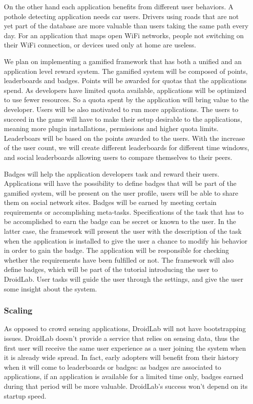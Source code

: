 \documentclass[conference,letterpaper]{IEEEtran}
\begin{document}
On the other hand each application benefits from different user behaviors. A pothole detecting application needs car users. Drivers using roads that are not yet part of the database are more valuable than users taking the same path every day. For an application that maps open WiFi networks, people not switching on their WiFi connection, or devices used only at home are useless.


We plan on implementing a gamified framework  that has both a unified and an application level reward system. The gamified system will be composed of points, leaderboards and badges. Points will be awarded for quotas that the applications spend. As developers have limited quota available, applications will be optimized to use fewer resources. So a quota spent by the application will bring value to the developer. Users will be also motivated to run more applications. The users to succeed in the game will have to make their setup desirable to the applications, meaning more plugin installations, permissions and higher quota limits. Leaderboars will be based on the points awarded to the users. With the increase of the user count, we will create different leaderboards for different time windows, and social leaderboards allowing users to compare themselves to their peers.

Badges will help the application developers task and reward their users. Applications will have the possibility to define badges that will be part of the gamified system, will be present on the user profile, users will be able to share them on social network sites. Badges will be earned by meeting certain requirements or accomplishing meta-tasks. Specifications of the task that has to be accomplished to earn the badge can be secret or known to the user. In the latter case, the framework will present the user with the description of the task when the application is installed to give the user a chance to modify his behavior in order to gain the badge. The application will be responsible for checking whether the requirements have been fulfilled or not. The framework will also define badges, which will be part of the tutorial introducing the user to DroidLab. User tasks will guide the user through the settings, and give the user some insight about the system.

\subsubsection{Scaling}
As opposed to crowd sensing applications, DroidLab will not have bootstrapping issues. DroidLab doesn't provide a service that relies on sensing data, thus the first user will receive the same user experience as a user joining the system when it is already wide spread. In fact, early adopters will benefit from their history when it will come to leaderboards or badges: as badges are associated to applications, if an application is available for a limited time only, badges earned during that period will be more valuable. DroidLab's success won't depend on its startup speed.
\end{document}
